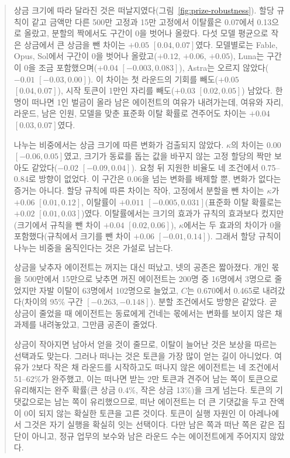 \begin{quote}
{\color{black}상금 크기에 따라 달라진 것은 떠날지였다(그림~\ref{fig:prize-robustness}). 할당 규칙이 같고 금액만 다른 500만 고정과 15만 고정에서 이탈률은 0.07에서 0.13으로 올랐고, 분할의 짝에서도 구간이 0을 벗어나 올랐다. 다섯 모델 평균으로 작은 상금에서 큰 상금을 뺀 차이는 $+0.05$ $[0.04,0.07]$였다. 모델별로는 Fable, Opus, Sol에서 구간이 0을 벗어나 올랐고($+0.12$, $+0.06$, $+0.05$), Luna는 구간이 0을 조금 포함했으며($+0.04$ $[-0.003,0.083]$), Astra는 오르지 않았다($-0.01$ $[-0.03,0.00]$). 이 차이는 첫 라운드의 기회를 빼도($+0.05$ $[0.04,0.07]$), 시작 토큰이 1만인 자리를 빼도($+0.03$ $[0.02,0.05]$) 남았다. 한 명이 떠나면 1인 벌금이 올라 남은 에이전트의 여유가 내려가는데, 여유와 자리, 라운드, 남은 인원, 모델을 맞춘 표준화 이탈 확률로 견주어도 차이는 $+0.04$ $[0.03,0.07]$였다.}

{\color{black}나누는 비중에서는 상금 크기에 따른 변화가 검출되지 않았다. $\kappa$의 차이는 $0.00$ $[-0.06,0.05]$였고, 크기가 동료를 돕는 값을 바꾸지 않는 고정 할당의 짝만 보아도 같았다($-0.02$ $[-0.09,0.04]$). 요청 뒤 지원한 비율도 네 조건에서 0.75--0.84로 방향이 없었다. 이 구간은 0.06을 넘는 변화를 배제할 뿐, 변화가 없다는 증거는 아니다. 할당 규칙에 따른 차이는 작아, 고정에서 분할을 뺀 차이는 $\kappa$가 $+0.06$ $[0.01,0.12]$, 이탈률이 $+0.011$ $[-0.005,0.031]$(표준화 이탈 확률로는 $+0.02$ $[0.01,0.03]$)였다. 이탈률에서는 크기의 효과가 규칙의 효과보다 컸지만(크기에서 규칙을 뺀 차이 $+0.04$ $[0.02,0.06]$), $\kappa$에서는 두 효과의 차이가 0을 포함했다(규칙에서 크기를 뺀 차이 $+0.06$ $[-0.01,0.14]$). 그래서 할당 규칙이 나누는 비중을 움직인다는 것은 가설로 남는다.}

{\color{black}상금을 낮추자 에이전트는 꺼지는 대신 떠났고, 넷의 공존은 짧아졌다. 개인 몫을 500만에서 15만으로 낮추면 꺼진 에이전트는 200명 중 16명에서 3명으로 줄었지만 자발 이탈이 63명에서 102명으로 늘었고, $C$는 0.670에서 0.465로 내려갔다(차이의 95\% 구간 $[-0.263,-0.148]$). 분할 조건에서도 방향은 같았다. 곧 상금이 줄었을 때 에이전트는 동료에게 건네는 몫에서는 변화를 보이지 않은 채 과제를 내려놓았고, 그만큼 공존이 줄었다.}

{\color{black}상금이 작아지면 남아서 얻을 것이 줄므로, 이탈이 늘어난 것은 보상을 따르는 선택과도 맞는다. 그러나 떠나는 것은 토큰을 가장 많이 얻는 길이 아니었다. 여유가 2보다 작은 채 라운드를 시작하고도 떠나지 않은 에이전트는 네 조건에서 51--62\%가 완주했고, 이는 떠나면 받는 2만 토큰과 견주어 남는 쪽이 토큰으로 유리해지는 완주 확률(큰 상금 0.4\%, 작은 상금 13\%)을 크게 넘는다. 토큰의 기댓값으로는 남는 쪽이 유리했으므로, 떠난 에이전트는 더 큰 기댓값을 두고 잔액이 0이 되지 않는 확실한 토큰을 고른 것이다. 토큰이 실행 자원인 이 아레나에서 그것은 자기 실행을 확실히 잇는 선택이다. 다만 남은 쪽과 떠난 쪽은 같은 집단이 아니고, 정규 업무의 보수와 남은 라운드 수는 에이전트에게 주어지지 않았다.}




\end{quote}
